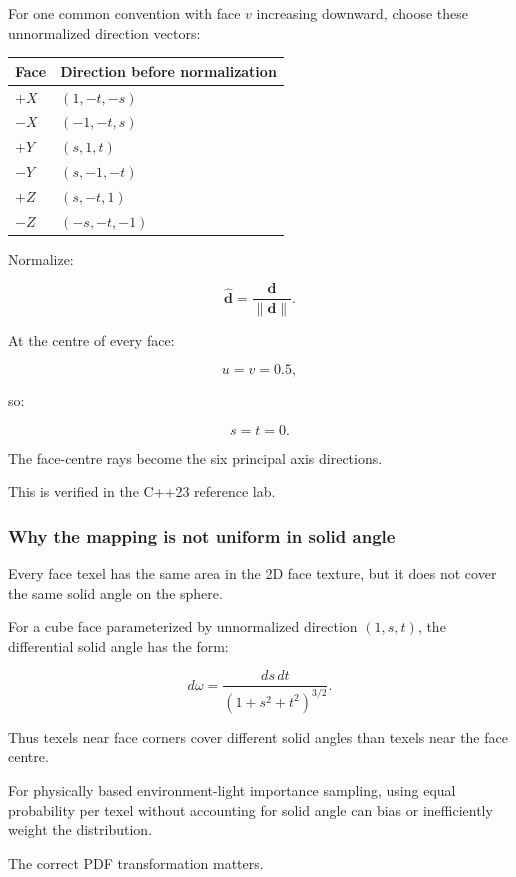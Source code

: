 For one common convention with face \(v\) increasing downward, choose these unnormalized direction vectors:

{\def\LTcaptype{none} %
\begin{longtable}[]{@{}ll@{}}
\toprule\noalign{}
Face & Direction before normalization \\
\midrule\noalign{}
\endhead
\bottomrule\noalign{}
\endlastfoot
\(+X\) & \((1,-t,-s)\) \\
\(-X\) & \((-1,-t,s)\) \\
\(+Y\) & \((s,1,t)\) \\
\(-Y\) & \((s,-1,-t)\) \\
\(+Z\) & \((s,-t,1)\) \\
\(-Z\) & \((-s,-t,-1)\) \\
\end{longtable}
}

Normalize:

\[ \boxed{ \hat{\mathbf d}= \frac{\mathbf d}{\|\mathbf d\|}. } \]

At the centre of every face:

\[ u=v=0.5, \]

so:

\[ s=t=0. \]

The face-centre rays become the six principal axis directions.

This is verified in the C++23 reference lab.

\subsubsection{Why the mapping is not uniform in solid angle}\label{why-the-mapping-is-not-uniform-in-solid-angle}

Every face texel has the same area in the 2D face texture, but it does not cover the same solid angle on the sphere.

For a cube face parameterized by unnormalized direction \((1,s,t)\), the differential solid angle has the form:

\[ \boxed{ d\omega= \frac{ds\,dt} {(1+s^2+t^2)^{3/2}}. } \]

Thus texels near face corners cover different solid angles than texels near the face centre.

For physically based environment-light importance sampling, using equal probability per texel without accounting for solid angle can bias or inefficiently weight the distribution.

The correct PDF transformation matters.

